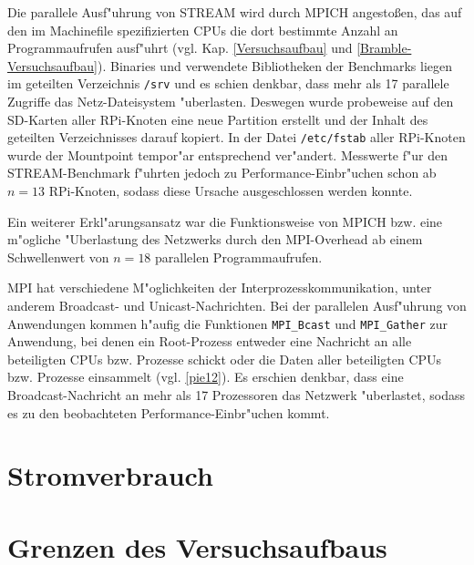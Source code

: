 \begin{enumerate}
Die parallele Ausf"uhrung von STREAM wird durch MPICH angesto\ss en, das auf den im Machinefile spezifizierten CPUs die dort bestimmte Anzahl an Programmaufrufen ausf"uhrt (vgl. Kap. \ref{Versuchsaufbau} und \ref{Bramble-Versuchsaufbau}). Binaries und verwendete Bibliotheken der Benchmarks liegen im geteilten Verzeichnis \texttt{/srv} und es schien denkbar, dass mehr als 17 parallele Zugriffe das Netz-Dateisystem "uberlasten. Deswegen wurde probeweise auf den SD-Karten aller RPi-Knoten eine neue Partition erstellt und der Inhalt des geteilten Verzeichnisses darauf kopiert. In der Datei \texttt{/etc/fstab} aller RPi-Knoten wurde der Mountpoint tempor"ar entsprechend ver"andert. Messwerte f"ur den STREAM-Benchmark f"uhrten jedoch zu Performance-Einbr"uchen schon ab $n=13$ RPi-Knoten, sodass diese Ursache ausgeschlossen werden konnte.  

Ein weiterer Erkl"arungsansatz war die Funktionsweise von MPICH bzw. eine m"ogliche "Uberlastung des Netzwerks durch den MPI-Overhead ab einem Schwellenwert von $n=18$ parallelen Programmaufrufen. 

MPI hat verschiedene M"oglichkeiten der Interprozesskommunikation, unter anderem Broadcast- und Unicast-Nachrichten. Bei der parallelen Ausf"uhrung von Anwendungen kommen h"aufig die Funktionen \texttt{MPI\_Bcast} und \texttt{MPI\_Gather} zur Anwendung, bei denen ein Root-Prozess entweder eine Nachricht an alle beteiligten CPUs bzw. Prozesse schickt oder die Daten aller beteiligten CPUs bzw. Prozesse einsammelt (vgl. \ref{pie12}). Es erschien denkbar, dass eine Broadcast-Nachricht an mehr als 17 Prozessoren das Netzwerk "uberlastet, sodass es zu den beobachteten Performance-Einbr"uchen kommt.  
\end{enumerate}

\section{Stromverbrauch}

\section{Grenzen des Versuchsaufbaus}\label{Grenzen}

